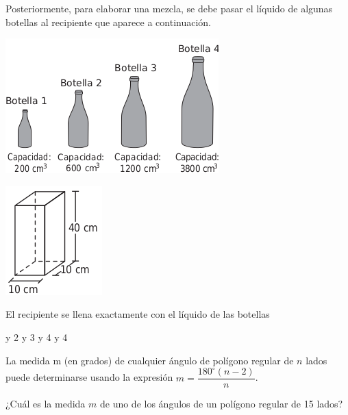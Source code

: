 \documentclass[10pt,letterpaper,addpoints]{exam}
\begin{document}
\begin{questions}
\begin{minipage}{.5\textwidth}
Posteriormente, para elaborar una mezcla, se debe pasar el líquido de algunas botellas al recipiente que aparece a continuación.
\end{minipage}
\begin{minipage}{.5\textwidth}
\begin{center}
\includegraphics[scale=.7]{Images/botellas.png} 
\end{center}
\end{minipage}

\begin{minipage}{.5\textwidth}
\begin{center}
\includegraphics[scale=.75]{Images/recipiente.png} 
\end{center}
\end{minipage}\hfill
\begin{minipage}{.5\textwidth}
El recipiente se llena exactamente con el líquido de las botellas
\begin{choices}
 y 2
 y 3
 y 4
 y 4
\end{choices}
\end{minipage}
\question La medida m (en grados) de cualquier ángulo de polígono regular de $n$ lados puede determinarse usando la expresión $m=\dfrac{180^{\circ}(n-2)}{n}$.

¿Cuál es la medida $m$ de uno de los ángulos de un polígono regular de 15 lados?


\end{questions}
\end{document}
